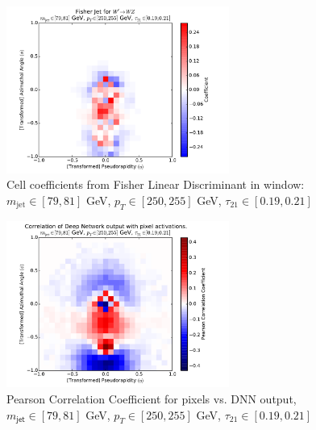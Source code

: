 \begin{figure}[htbp]
  \centering
  \includegraphics[width=0.65\textwidth]{figures/fld-benwindow.pdf}
  \caption{Cell coefficients from Fisher Linear Discriminant in window: $m_\text{jet}\in [79, 81]$ GeV, $p_{T}\in [250, 255]$ GeV, $\tau_{21}\in[0.19, 0.21]$}
  \label{fig:fldWindow}
\end{figure}

\begin{figure}[htbp]
  \centering
  \includegraphics[width=0.65\textwidth]{figures/pixel-activations-corr-benwindow.pdf}
  \caption{Pearson Correlation Coefficient for pixels vs. DNN output, $m_{\mathsf{jet}}\in [79, 81]$ GeV, $p_{T}\in [250, 255]$ GeV, $\tau_{21}\in[0.19, 0.21]$}
  \label{fig:corrWindow}
\end{figure}

%




